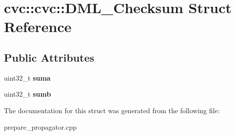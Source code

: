 \hypertarget{structcvc_1_1cvc_1_1DML__Checksum}{\section{cvc\-:\-:cvc\-:\-:D\-M\-L\-\_\-\-Checksum Struct Reference}
\label{structcvc_1_1cvc_1_1DML__Checksum}
}
\subsection*{Public Attributes}
\begin{DoxyCompactItemize}
\item 
\hypertarget{structcvc_1_1cvc_1_1DML__Checksum_abf9bd8304f1fcce081780c9d98ed4fa6}{uint32\-\_\-t {\bfseries suma}}\label{structcvc_1_1cvc_1_1DML__Checksum_abf9bd8304f1fcce081780c9d98ed4fa6}

\item 
\hypertarget{structcvc_1_1cvc_1_1DML__Checksum_a69268d31a7e1aeaf303b0e6e9fb9caed}{uint32\-\_\-t {\bfseries sumb}}\label{structcvc_1_1cvc_1_1DML__Checksum_a69268d31a7e1aeaf303b0e6e9fb9caed}

\end{DoxyCompactItemize}


The documentation for this struct was generated from the following file\-:\begin{DoxyCompactItemize}
\item 
prepare\-\_\-propagator.\-cpp\end{DoxyCompactItemize}
